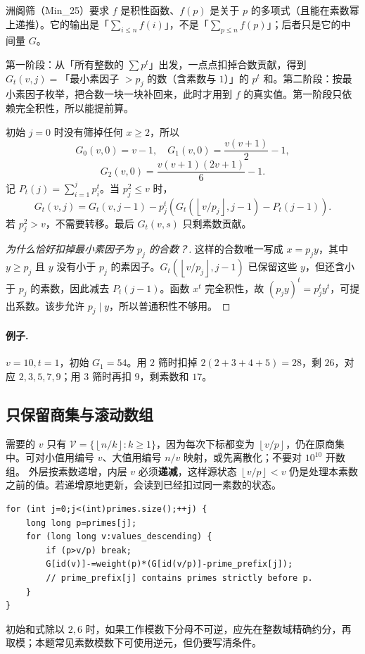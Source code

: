 \documentclass[UTF8,a4paper,11pt,oneside,openany,fontset=fandol]{ctexbook}
\theoremstyle{definition}
\newcommand{\floor}[1]{\left\lfloor #1\right\rfloor}
\begin{document}
\begin{tip}
洲阁筛（Min\_25）要求 $f$ 是积性函数、$f(p)$ 是关于 $p$ 的多项式（且能在素数幂上递推）。它的输出是「$\sum_{i\le n}f(i)$」，不是「$\sum_{p\le n}f(p)$」；后者只是它的中间量 $G$。
\end{tip}

\begin{tip}[两阶段各自在做什么]
第一阶段：从「所有整数的 $\sum p^t$」出发，一点点扣掉合数贡献，得到 $G_t(v,j)=$「最小素因子 $>p_j$ 的数（含素数与 $1$）」的 $p^t$ 和。第二阶段：按最小素因子枚举，把合数一块一块补回来，此时才用到 $f$ 的真实值。第一阶段只依赖完全积性，所以能提前算。
\end{tip}

初始 $j=0$ 时没有筛掉任何 $x\ge2$，所以
\[
G_0(v,0)=v-1,\quad G_1(v,0)=\frac{v(v+1)}2-1,
\]
\[
G_2(v,0)=\frac{v(v+1)(2v+1)}6-1.
\]
记 $P_t(j)=\sum_{i=1}^jp_i^t$。当 $p_j^2\le v$ 时，
\[
 G_t(v,j)=G_t(v,j-1)-p_j^t
 \left(G_t(\floor{v/p_j},j-1)-P_t(j-1)\right).
\]
若 $p_j^2>v$，不需要转移。最后 $G_t(v,s)$ 只剩素数贡献。


\begin{proof}[为什么恰好扣掉最小素因子为 $p_j$ 的合数？]
这样的合数唯一写成 $x=p_jy$，其中 $y\ge p_j$ 且 $y$ 没有小于 $p_j$ 的素因子。$G_t(\floor{v/p_j},j-1)$ 已保留这些 $y$，但还含小于 $p_j$ 的素数，因此减去 $P_t(j-1)$。函数 $x^t$ 完全积性，故 $(p_jy)^t=p_j^ty^t$，可提出系数。该步允许 $p_j\mid y$，所以普通积性不够用。
\end{proof}
\paragraph{例子.} $v=10,t=1$，初始 $G_1=54$。用 $2$ 筛时扣掉 $2(2+3+4+5)=28$，剩 $26$，对应 $2,3,5,7,9$；用 $3$ 筛时再扣 $9$，剩素数和 $17$。

\subsection{只保留商集与滚动数组}
需要的 $v$ 只有 $\mathcal V=\{\floor{n/k}:k\ge1\}$，因为每次下标都变为 $\floor{v/p}$，仍在原商集中。可对小值用编号 $v$、大值用编号 $n/v$ 映射，或先离散化；不要对 $10^{10}$ 开数组。
外层按素数递增，内层 $v$ 必须\textbf{递减}，这样源状态 $\floor{v/p}<v$ 仍是处理本素数之前的值。若递增原地更新，会读到已经扣过同一素数的状态。
\begin{lstlisting}
for (int j=0;j<(int)primes.size();++j) {
    long long p=primes[j];
    for (long long v:values_descending) {
        if (p>v/p) break;
        G[id(v)]-=weight(p)*(G[id(v/p)]-prime_prefix[j]);
        // prime_prefix[j] contains primes strictly before p.
    }
}
\end{lstlisting}
初始和式除以 $2,6$ 时，如果工作模数下分母不可逆，应先在整数域精确约分，再取模；本题常见素数模数下可使用逆元，但仍要写清条件。
\end{document}
